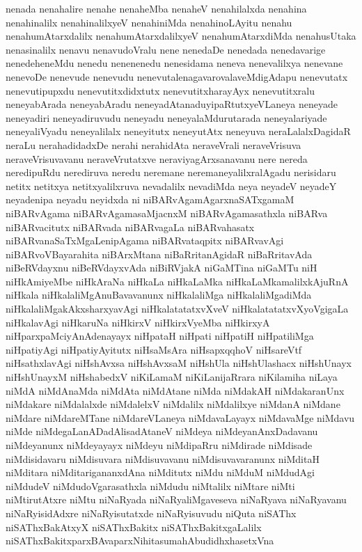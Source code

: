{nenada
nenahalire
nenahe
nenaheMba
nenaheV
nenahilalxda
nenahina
nenahinalilx
nenahinalilxyeV
nenahiniMda
nenahinoLAyitu
nenahu
nenahumAtarxdalilx
nenahumAtarxdalilxyeV
nenahumAtarxdiMda
nenahusUtaka
nenasinalilx
nenavu
nenavudoVralu
nene
nenedaDe
nenedada
nenedavarige
nenedeheneMdu
nenedu
nenenenedu
nenesidama
neneva
nenevalilxya
nenevane
nenevoDe
nenevude
nenevudu
nenevutalenagavarovalaveMdigAdapu
nenevutatx
nenevutipupxdu
nenevutitxdidxtutx
nenevutitxharayAyx
nenevutitxralu
neneyabArada
neneyabAradu
neneyadAtanaduyipaRtutxyeVLaneya
neneyade
neneyadiri
neneyadiruvudu
neneyadu
neneyalaMdurutarada
neneyalariyade
neneyaliVyadu
neneyalilalx
neneyitutx
neneyutAtx
neneyuva
neraLalalxDagidaR
neraLu
nerahadidadxDe
nerahi
nerahidAta
neraveVrali
neraveVrisuva
neraveVrisuvavanu
neraveVrutatxve
neraviyagArxsanavanu
nere
nereda
neredipuRdu
nerediruva
neredu
neremane
neremaneyalilxralAgadu
nerisidaru
netitx
netitxya
netitxyalilxruva
nevadalilx
nevadiMda
neya
neyadeV
neyadeY
neyadenipa
neyadu
neyidxda
ni
niBARvAgamAgarxnaSATxgamaM
niBARvAgama
niBARvAgamasaMjacnxM
niBARvAgamasathxla
niBARva
niBARvacitutx
niBARvada
niBARvagaLa
niBARvahasatx
niBARvanaSaTxMgaLenipAgama
niBARvataqpitx
niBARvavAgi
niBARvoVBayarahita
niBArxMtana
niBaRritanAgidaR
niBaRritavAda
niBeRVdayxnu
niBeRVdayxvAda
niBiRVjakA
niGaMTina
niGaMTu
niH
niHkAmiyeMbe
niHkAraNa
niHkaLa
niHkaLaMka
niHkaLaMkamalilxkAjuRnA
niHkala
niHkalaliMgAnuBavavanunx
niHkalaliMga
niHkalaliMgadiMda
niHkalaliMgakAkxsharxyavAgi
niHkalatatatxvXveV
niHkalatatatxvXyoVgigaLa
niHkalavAgi
niHkaruNa
niHkirxV
niHkirxVyeMba
niHkirxyA
niHparxpaMciyAnAdenayayx
niHpataH
niHpati
niHpatiH
niHpatiliMga
niHpatiyAgi
niHpatiyAyitutx
niHsaMsAra
niHsapxqqhoV
niHsareVtf
niHsathxlavAgi
niHshAvxsa
niHshAvxsaM
niHshUla
niHshUlashacx
niHshUnayx
niHshUnayxM
niHshabedxV
niKiLamaM
niKiLanijaRrara
niKilamiha
niLaya
niMdA
niMdAnaMda
niMdAta
niMdAtane
niMda
niMdakAH
niMdakaranUnx
niMdakare
niMdalalxde
niMdalelxV
niMdalilx
niMdalilxye
niMdanA
niMdane
niMdare
niMdareMTane
niMdareVLaneya
niMdavaLayayx
niMdavaMge
niMdavu
niMde
niMdegaLanADadAlisadAtaneV
niMdeya
niMdeyanAnxDadavanu
niMdeyanunx
niMdeyayayx
niMdeyu
niMdipaRru
niMdirade
niMdisade
niMdisidavaru
niMdisuvara
niMdisuvavanu
niMdisuvavaranunx
niMditaH
niMditara
niMditarigananxdAna
niMditutx
niMdu
niMduM
niMdudAgi
niMdudeV
niMdudoVgarasathxla
niMdudu
niMtalilx
niMtare
niMti
niMtirutAtxre
niMtu
niNaRyada
niNaRyaliMgaveseva
niNaRyava
niNaRyavanu
niNaRyisidAdxre
niNaRyisutatxde
niNaRyisuvudu
niQuta
niSAThx
niSAThxBakAtxyX
niSAThxBakitx
niSAThxBakitxgaLalilx
niSAThxBakitxparxBAvaparxNihitasumahAbudidhxhasetxVna
}
